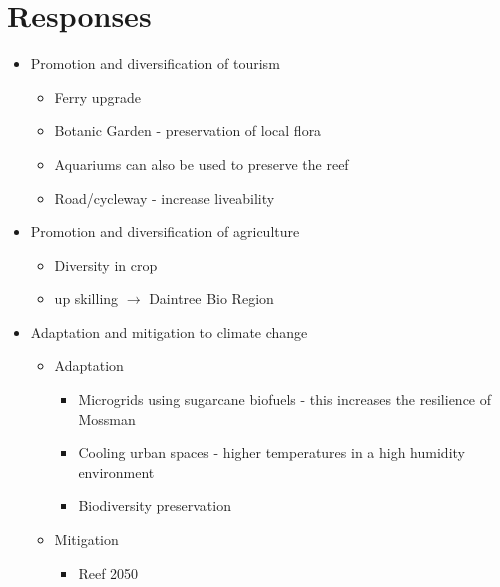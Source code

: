 	\section{Responses}
		\begin{itemize}
			\item Promotion and diversification of tourism
				\begin{itemize}
					\item Ferry upgrade
					\item Botanic Garden - preservation of local flora
					\item Aquariums can also be used to preserve the reef
					\item Road/cycleway - increase liveability
				\end{itemize}
			\item Promotion and diversification of agriculture
				\begin{itemize}
					\item Diversity in crop
					\item up skilling $\rightarrow$ Daintree Bio Region
				\end{itemize}
			\item Adaptation and mitigation to climate change
				\begin{itemize}
					\item Adaptation
						\begin{itemize}
							\item Microgrids using sugarcane biofuels - this increases the resilience of Mossman
							\item Cooling urban spaces - higher temperatures in a high humidity environment
							\item Biodiversity preservation
						\end{itemize}
					\item Mitigation
						\begin{itemize}
							\item Reef 2050
						\end{itemize}
				\end{itemize}
		\end{itemize}

